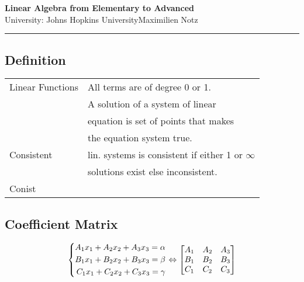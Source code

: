 \documentclass[5pt]{article}
\begin{document}
\begin{center}
     \Large{\textbf{Linear Algebra from Elementary to Advanced}}\\
     \footnotesize{University: Johns Hopkins University}\hfill\footnotesize{\textcopyright Maximilien Notz \the\year{}}
     \noindent\rule{20.2cm}{0.4pt}
\end{center}


\begin{multicols}{2}
\setcounter{secnumdepth}{0}


\subsection{Definition}
\begin{tabular}{ll}
    Linear Functions & All terms are of  degree 0 or 1. \\
                   & A solution of a system of linear \\ 
                   & equation is set of points that makes \\
                   & the equation system true. \\
     Consistent    & lin. systems is consistent if either 1 or $\infty$ \\
                   & solutions exist else inconsistent.\\
     Conist
\end{tabular}


\subsection{Coefficient Matrix}
\begin{equation}
\centering
\left\{\begin{split}
A_1x_1+A_2x_2+A_3x_3=\alpha \\
B_1x_1+B_2x_2+B_3x_3=\beta \\
C_1x_1+C_2x_2+C_3x_3=\gamma \\
\end{split}\right.
\Leftrightarrow
\begin{bmatrix}
    A_1 & A_2 & A_3\\
    B_1 & B_2 & B_3\\
    C_1 & C_2 & C_3\\
\end{bmatrix}
\end{equation}



\end{multicols}
\end{document}
